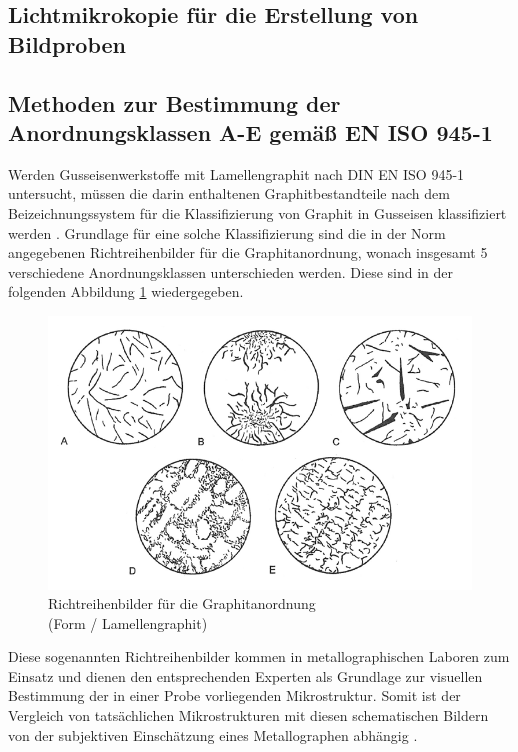 \documentclass[
fontsize=10pt, 
listof = totoc,
parskip = half	
]{report}
\newcommand{\uproman}[1]{\uppercase\expandafter{\romannumeral#1}}
\begin{document}
\subsection{Lichtmikrokopie für die Erstellung von Bildproben}
\label{subsec:Lichtmikroskopie}

\subsection{Methoden zur Bestimmung der Anordnungsklassen A-E gemäß EN ISO 945-1}
\label{subsec:MethodenBestAnordnungsklassen}
Werden Gusseisenwerkstoffe mit Lamellengraphit nach DIN EN ISO 945-1 untersucht, müssen die darin enthaltenen Graphitbestandteile nach dem Beizeichnungssystem für die Klassifizierung von Graphit in Gusseisen klassifiziert  werden \cite[Seite 6]{ISO945}. Grundlage für eine solche Klassifizierung sind die in der Norm angegebenen Richtreihenbilder für die Graphitanordnung, wonach insgesamt 5 verschiedene Anordnungsklassen unterschieden werden. Diese sind in der folgenden Abbildung \ref{fig:Anordnungsklassen} wiedergegeben.

\begin{figure}[H]
	\centering
	\includegraphics[scale=0.6]{pics/Anordnungsklassen}
	\caption{Richtreihenbilder für die Graphitanordnung\\ (Form \uproman{1} / Lamellengraphit) \cite[S.8]{ISO945}}
	\label{fig:Anordnungsklassen}
\end{figure}

\noindent Diese sogenannten Richtreihenbilder kommen in metallographischen Laboren zum Einsatz und dienen den entsprechenden Experten als Grundlage zur visuellen Bestimmung der in einer Probe vorliegenden Mikrostruktur. Somit ist der Vergleich von tatsächlichen Mikrostrukturen mit diesen schematischen Bildern von der subjektiven Einschätzung eines Metallographen abhängig \cite[Seite 27]{ISO945}.
\end{document}
